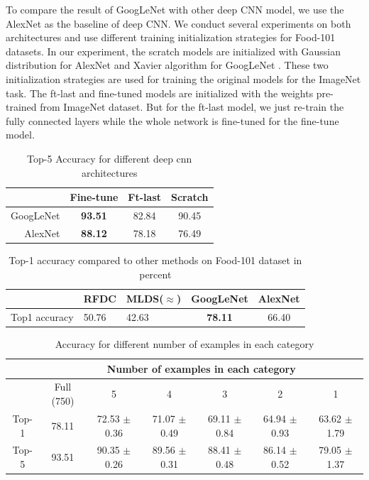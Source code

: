 To compare the result of GoogLeNet with other deep CNN model, we use the AlexNet as the baseline of deep CNN.
We conduct several experiments on both architectures and use different training initialization strategies for Food-101 datasets. In our experiment, the scratch models are initialized with Gaussian distribution for AlexNet and Xavier algorithm for GoogLeNet \cite{glorot2010understanding}. These two initialization strategies are used for training the original models for the ImageNet task. The ft-last and fine-tuned models are initialized with the weights pre-trained from ImageNet dataset. But for the ft-last model, we just re-train the fully connected layers while the whole network is fine-tuned for the fine-tune model.
\begin{table}[htbp]
  \centering
  \caption{Top-5 Accuracy for different deep cnn architectures}
    \begin{tabular}{r|ccc}
    \toprule
          & Fine-tune & Ft-last & Scratch \\
    \midrule
    GoogLeNet & \textbf{93.51} & 82.84 & 90.45 \\
    AlexNet & \textbf{88.12} & 78.18 & 76.49 \\
    \bottomrule
    \end{tabular}%
  \label{tab:ft}%
\end{table}%



\begin{table}[htbp]
  \centering
  \caption{Top-1 accuracy compared to other methods on Food-101 dataset in percent}
    \begin{tabular}{c|C{3cm}C{3cm}cc}
    \toprule
          & RFDC\cite{bossard2014food} & MLDS($\approx$\cite{singh2012unsupervised}) & GoogLeNet & AlexNet \\
    \midrule
    Top1 accuracy & 50.76 & 42.63& \textbf{78.11 }& 66.40 \\
    \bottomrule
    \end{tabular}%
    \label{tab:101}
\end{table}%
\begin{table}[htbp]
  \centering
  \caption{Accuracy for different number of examples in each category}
    \begin{tabular}{c|c|c|c|c|c|c}
    \toprule
        &\multicolumn{6}{c}{Number of examples in each category }\\
        \midrule
          & Full (750)   &  5     & 4     & 3     & 2     & 1 \\
    \midrule
    Top-1  & 78.11& 72.53 $\pm$ 0.36& 71.07 $\pm$ 0.49& 69.11 $\pm$ 0.84& 64.94 $\pm$ 0.93& 63.62 $\pm$ 1.79 \\
    Top-5  & 93.51 & 90.35 $\pm$ 0.26& 89.56 $\pm$ 0.31 & 88.41 $\pm$ 0.48   & 86.14 $\pm$ 0.52& 79.05 $\pm$ 1.37 \\
    \bottomrule
    \end{tabular}%
  \label{tab:mini}%
\end{table}%


